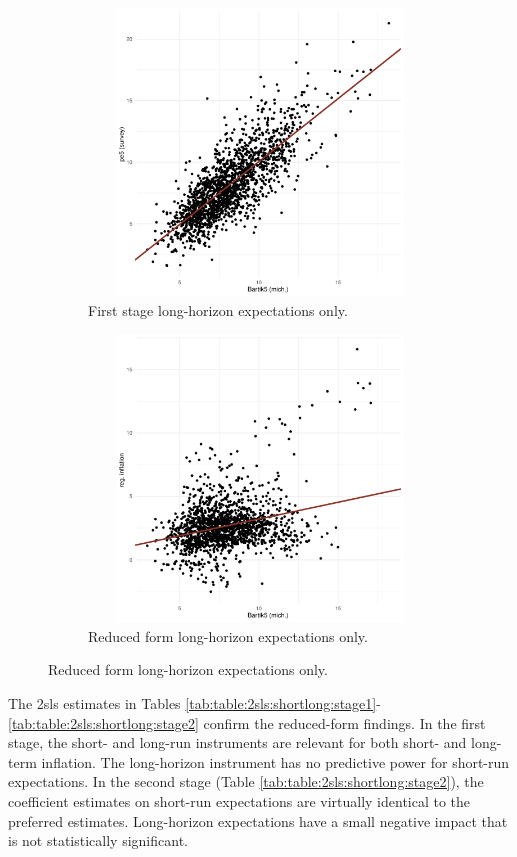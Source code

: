 \documentclass[12pt]{article}
\begin{document}
\begin{figure}
\centering
\caption{Long-run inflation expectations: reduced-form estimates.}\label{fig:5year:redform}
\begin{subfigure}[t]{0.75\textwidth}
\centering
\includegraphics[width = 5in, height =3in]{figs/firstStage5only}
%
\caption{First stage long-horizon expectations only. }\label{5yearsubfig:shares:group}
\end{subfigure}
\vfill
\begin{subfigure}[t]{0.75\textwidth}
\centering
\includegraphics[width =5in, height =3in]{figs/redform5only}
%
\caption{Reduced form long-horizon expectations only.}\label{5yearsubfig:shares:cps}
\end{subfigure}
\end{figure}

The 2sls estimates in Tables \ref{tab:table:2sls:shortlong:stage1}-\ref{tab:table:2sls:shortlong:stage2} confirm the reduced-form findings. In the first stage, the short- and long-run instruments are relevant for both short- and long-term inflation. The long-horizon instrument has no predictive power for short-run expectations. In the second stage (Table \ref{tab:table:2sls:shortlong:stage2}), the coefficient estimates on short-run expectations are virtually identical to the preferred estimates. Long-horizon expectations have a small negative impact that is not statistically significant.  
\end{document}
